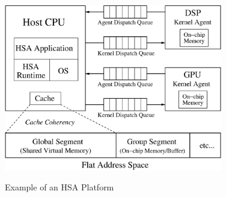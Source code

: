         \begin{figure}[!ht] 
            \caption{Example of an HSA Platform}
            \centering
            \includegraphics[width=0.85\textwidth]{./figs/systemspec.eps}
            \label{fig:systemspec}
        \end{figure}
